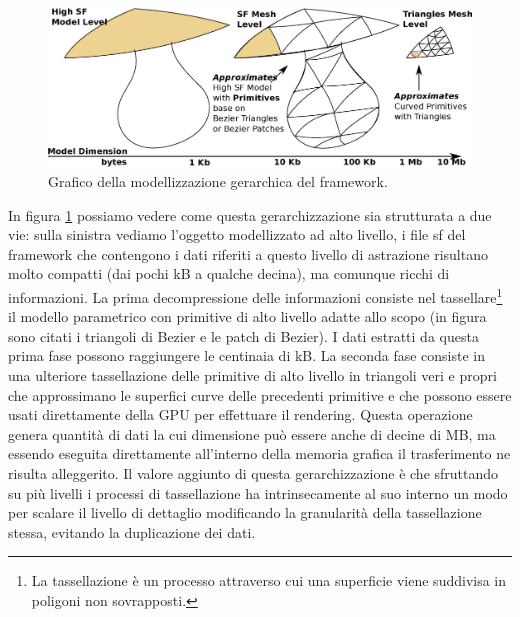 \begin{figure}
\begin{center}
\includegraphics[width=\textwidth]{Immagini/hierarchicalmodeling}
\caption{Grafico della modellizzazione gerarchica del framework.\label{f:hierarchicalmodeling}} 
\end{center} 
\end{figure}

In figura \ref{f:hierarchicalmodeling} possiamo vedere come questa gerarchizzazione sia strutturata a due vie: sulla sinistra vediamo l'oggetto modellizzato ad alto livello, i file sf del framework che contengono i dati riferiti a questo livello di astrazione risultano molto compatti (dai pochi \ac{kB} a qualche decina), ma comunque ricchi di informazioni.
La prima decompressione delle informazioni consiste nel tassellare\footnote{La tassellazione \`e un processo attraverso cui una superficie viene suddivisa in poligoni non sovrapposti.\cite{book:realtimerendering}} il modello parametrico con primitive di alto livello adatte allo scopo (in figura sono citati i triangoli di Bezier e le patch di Bezier). I dati estratti da questa prima fase possono raggiungere le centinaia di \ac{kB}. La seconda fase consiste in una ulteriore tassellazione delle primitive di alto livello in triangoli veri e propri che approssimano le superfici curve delle precedenti primitive e che possono essere usati direttamente della \ac{GPU} per effettuare il rendering. Questa operazione genera quantit\`a di dati la cui dimensione pu\`o essere anche di decine di \ac{MB}, ma essendo eseguita direttamente all'interno della memoria grafica il trasferimento ne risulta alleggerito. Il valore aggiunto di questa gerarchizzazione \`e che sfruttando su pi\`u livelli i processi di tassellazione ha intrinsecamente al suo interno un modo per scalare il livello di dettaglio modificando la granularit\`a della tassellazione stessa, evitando la duplicazione dei dati.


